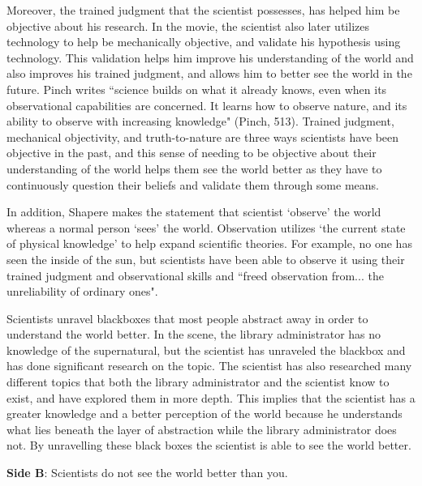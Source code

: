 \documentclass[11pt, oneside]{article}
\begin{document}
\par Moreover, the trained judgment that the scientist possesses, has helped him be objective about his research. In the movie, the scientist also later utilizes technology to help be mechanically objective, and validate his hypothesis using technology. This validation helps him improve his understanding of the world and also improves his trained judgment, and allows him to better see the world in the future. Pinch writes ``science builds on what it already knows, even when its observational capabilities are concerned. It learns how to observe nature, and its ability to observe with increasing knowledge" (Pinch, 513). Trained judgment, mechanical objectivity, and truth-to-nature are three ways scientists have been objective in the past, and this sense of needing to be objective about their understanding of the world helps them see the world better as they have to continuously question their beliefs and validate them through some means. 
\par In addition, Shapere makes the statement that scientist `observe' the world whereas a normal person `sees' the world. Observation utilizes `the current state of physical knowledge' to help expand scientific theories. For example, no one has seen the inside of the sun, but scientists have been able to observe it using their trained judgment and observational skills and ``freed observation from... the unreliability of ordinary ones".
\par Scientists unravel blackboxes that most people abstract away in order to understand the world better. In the scene, the library administrator has no knowledge of the supernatural, but the scientist has unraveled the blackbox and has done significant research on the topic. The scientist has also researched many different topics that both the library administrator and the scientist know to exist, and have explored them in more depth. This implies that the scientist has a greater knowledge and a better perception of the world because he understands what lies beneath the layer of abstraction while the library administrator does not. By unravelling these black boxes the scientist is able to see the world better.


\noindent \textbf{Side B}: Scientists do not see the world better than you.

\end{document}
